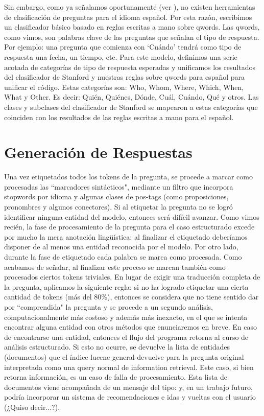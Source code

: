 Sin embargo, como ya señalamos oportunamente (ver ), no existen herramientas de clasificación de preguntas para el idioma español. Por esta razón, escribimos un clasificador básico basado en reglas escritas a mano sobre qwords. Las qwords, como vimos, son palabras clave de las preguntas que señalan el tipo de respuesta. Por ejemplo: una pregunta que comienza con `Cuándo' tendrá como tipo de respuesta una fecha, un tiempo, etc. Para este modelo, definimos una serie acotada de categorías de tipo de respuesta esperadas y unificamos los resultados del clasificador de Stanford y nuestras reglas sobre qwords para español para unificar el código. Estas categorías son:  Who, Whom, Where, Which,  When,  What y Other. Es decir: Quién, Quiénes, Dónde, Cuál, Cuándo, Qué y otros. Las clases y subclases del clasificador de Stanford se mapearon a estas categorías que coinciden con los resultados de las reglas escritas a mano para el español. 


\section{Generación de Respuestas}
\label{sec:ar-mitic}
\horrible

Una vez etiquetados todos los tokens de la pregunta, se procede a marcar como procesadas las ``marcadores sintácticos", mediante un filtro que incorpora stopwords por idioma y algunas clases de pos-tags (como proposiciones, pronombres y algunos conectores). Si al etiquetar la pregunta no se logró identificar ninguna entidad del modelo, entonces será difícil avanzar. Como vimos recién, la fase de procesamiento de la pregunta para el caso estructurado excede por mucho la mera anotación lingüística: al finalizar el etiquetado deberíamos disponer de al menos una entidad reconocida por el modelo. Por otro lado, durante la fase de etiquetado cada palabra se marca como procesada. Como acabamos de señalar, al finalizar este proceso se marcan también como procesados ciertos tokens triviales. En lugar de exigir una traducción completa de la pregunta, aplicamos la siguiente regla: si no ha logrado etiquetar una cierta cantidad de tokens (más del 80\%), entonces se considera que no tiene sentido dar por ``comprendida" la pregunta y se procede a un segundo análisis, computacionalmente más costoso y además más inexacto, en el que se intenta encontrar alguna entidad con otros métodos que enunciaremos en breve. En caso de encontrarse una entidad, entonces el flujo del programa retorna al curso de análisis estructurado. Si esto no ocurre, se devuelve la lista de entidades (documentos) que el índice lucene general devuelve para la pregunta original interpretada como una query normal de information retrieval. Este caso, si bien retorna información, es un caso de falla de procesamiento. Esta lista de documentos viene acompañada de un mensaje del tipo:  y, en un trabajo futuro, podría incorporar un sistema de recomendaciones e idas y vueltas con el usuario (¿Quiso decir...?).

